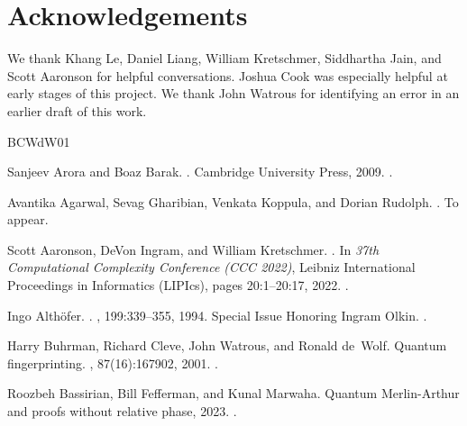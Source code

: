 \documentclass[10pt,a4paper]{article}
\theoremstyle{definition}
\begin{document}
\section*{Acknowledgements}
We thank Khang Le, Daniel Liang, William Kretschmer, Siddhartha Jain, and Scott Aaronson for helpful conversations. Joshua Cook was especially helpful at early stages of this project. We thank John Watrous for identifying an error in an earlier draft of this work.



\newcommand{\etalchar}[1]{$^{#1}$}
\begin{thebibliography}{BCWdW01}

Sanjeev Arora and Boaz Barak.
.
\newblock Cambridge University Press, 2009.
\newblock \href {https://doi.org/10.1017/CBO9780511804090}
  {}.

Avantika Agarwal, Sevag Gharibian, Venkata Koppula, and Dorian Rudolph.
.
\newblock To appear.

Scott Aaronson, DeVon Ingram, and William Kretschmer.
.
\newblock In {\em 37th Computational Complexity Conference (CCC 2022)}, Leibniz
  International Proceedings in Informatics (LIPIcs), pages 20:1--20:17, 2022.
\newblock \href {https://doi.org/10.4230/LIPIcs.CCC.2022.20}
  {}.

Ingo Althöfer.
.
, 199:339--355, 1994.
\newblock Special Issue Honoring Ingram Olkin.
\newblock \href {https://doi.org/10.1016/0024-3795(94)90357-3}
  {}.

Harry Buhrman, Richard Cleve, John Watrous, and Ronald de~Wolf.
\newblock Quantum fingerprinting.
, 87(16):167902, 2001.
\newblock \href {https://doi.org/10.1103/PhysRevLett.87.167902}
  {}.

Roozbeh Bassirian, Bill Fefferman, and Kunal Marwaha.
\newblock Quantum {M}erlin-{A}rthur and proofs without relative phase, 2023.
\newblock \href {http://arxiv.org/abs/2306.13247} {}.


\end{thebibliography}
\end{document}
